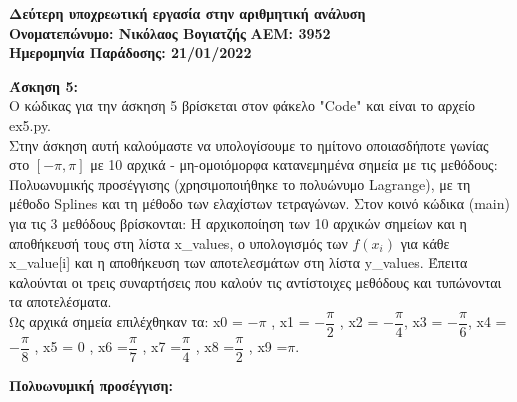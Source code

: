 \documentclass{article}
\begin{document}
\begin{center}

\large{\textbf{Δεύτερη υποχρεωτική εργασία στην αριθμητική ανάλυση}}\\
\large{\textbf{Ονοματεπώνυμο: Νικόλαος Βογιατζής} \textbf{ΑΕΜ: 3952}}\\

\large{\textbf{Ημερομηνία Παράδοσης: 21/01/2022}}\\
\end{center}

\large{\textbf{Άσκηση 5:}}\\
Ο κώδικας για την άσκηση 5 βρίσκεται στον φάκελο "Code" και είναι το αρχείο ex5.py.\\
Στην άσκηση αυτή καλούμαστε να υπολογίσουμε το ημίτονο οποιασδήποτε γωνίας στο $[-\pi, \pi]$ με 10 αρχικά - μη-ομοιόμορφα κατανεμημένα σημεία με τις μεθόδους: Πολυωνυμικής προσέγγισης (χρησιμοποιήθηκε το πολυώνυμο Lagrange), με τη μέθοδο Splines και
τη μέθοδο των ελαχίστων τετραγώνων. Στον κοινό κώδικα (main) για τις 3 μεθόδους βρίσκονται: Η αρχικοποίηση των 10 αρχικών σημείων και η αποθήκευσή τους στη λίστα x\_values, ο υπολογισμός των
$f(x_i) $ για κάθε x\_value[i] και η αποθήκευση των αποτελεσμάτων στη λίστα y\_values. Έπειτα καλούνται οι τρεις συναρτήσεις που καλούν τις αντίστοιχες μεθόδους και τυπώνονται τα αποτελέσματα. \\
Ως αρχικά σημεία επιλέχθηκαν τα: x0 = $-\pi$ , x1 = $-\dfrac{\pi}{2}$ , x2 = $-\dfrac{\pi}{4}$, x3 = $-\dfrac{\pi}{6}$, x4 =$-\dfrac{\pi}{8}$ , x5 = 0 , x6 =$\dfrac{\pi}{7}$ , x7 =$\dfrac{\pi}{4}$ , x8 =$\dfrac{\pi}{2}$ , x9 =$\pi$.
\par\textbf{Πολυωνυμική προσέγγιση:}\\
\end{document}
